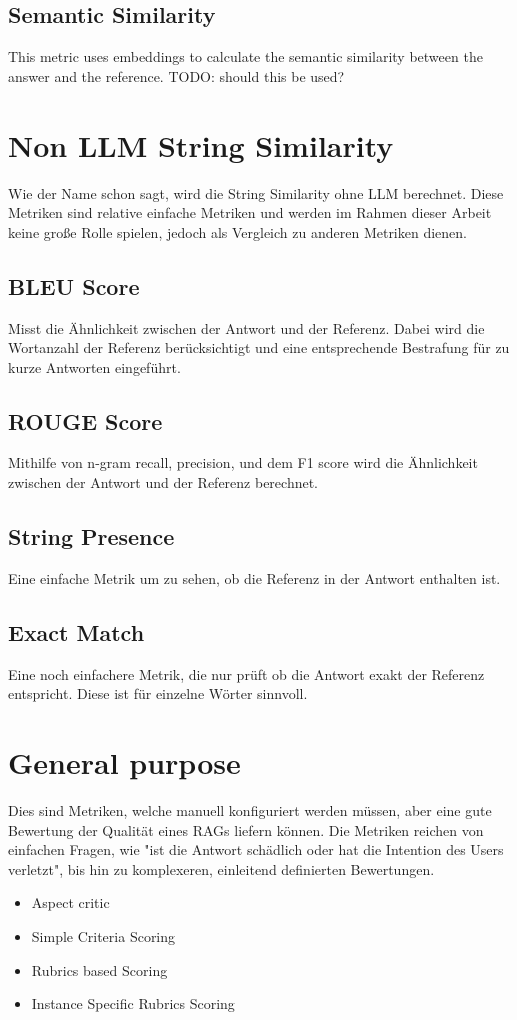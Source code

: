 \subsection{Semantic Similarity}
This metric uses embeddings to calculate the semantic similarity between the answer and the reference. TODO: should this be used?

\section{Non LLM String Similarity}
Wie der Name schon sagt, wird die String Similarity ohne LLM berechnet. Diese Metriken sind relative einfache Metriken und werden im Rahmen dieser Arbeit keine große Rolle spielen, jedoch als Vergleich zu anderen Metriken dienen.
\subsection{BLEU Score}
Misst die Ähnlichkeit zwischen der Antwort und der Referenz. Dabei wird die Wortanzahl der Referenz berücksichtigt und eine entsprechende Bestrafung für zu kurze Antworten eingeführt.
\subsection{ROUGE Score}
Mithilfe von n-gram recall, precision, und dem F1 score wird die Ähnlichkeit zwischen der Antwort und der Referenz berechnet.
\subsection{String Presence}
Eine einfache Metrik um zu sehen, ob die Referenz in der Antwort enthalten ist.
\subsection{Exact Match}
Eine noch einfachere Metrik, die nur prüft ob die Antwort exakt der Referenz entspricht. Diese ist für einzelne Wörter sinnvoll.

\section{General purpose}
Dies sind Metriken, welche manuell konfiguriert werden müssen, aber eine gute Bewertung der Qualität eines RAGs liefern können.
Die Metriken reichen von einfachen Fragen, wie "ist die Antwort schädlich oder hat die Intention des Users verletzt", bis hin zu komplexeren, einleitend definierten Bewertungen.
\begin{itemize}
    \item Aspect critic
    \item Simple Criteria Scoring
    \item Rubrics based Scoring
    \item Instance Specific Rubrics Scoring
  \end{itemize}

